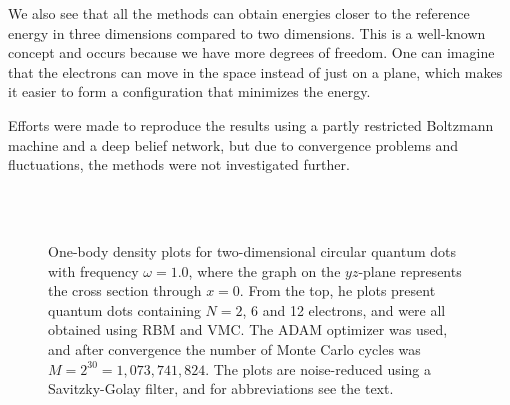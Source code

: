 We also see that all the methods can obtain energies closer to the reference energy in three dimensions compared to two dimensions. This is a well-known concept and occurs because we have more degrees of freedom. One can imagine that the electrons can move in the space instead of just on a plane, which makes it easier to form a configuration that minimizes the energy. 

Efforts were made to reproduce the results using a partly restricted Boltzmann machine and a deep belief network, but due to convergence problems and fluctuations, the methods were not investigated further. 

\begin{figure}
	\centering
	\captionsetup[subfigure]{labelformat=empty}
	\hspace{0.1cm}
	\hspace{-0.0cm}
	\\
	
	\hspace{0.05cm}
	\hspace{-0.0cm}
	\\
	
	\hspace{0.1cm}
	\hspace{-0.0cm}
	
	\caption{One-body density plots for two-dimensional circular quantum dots with frequency $\omega=1.0$, where the graph on the $yz$-plane represents the cross section through $x=0$. From the top, he plots present quantum dots containing $N=2$, 6 and 12 electrons, and were all obtained using RBM and VMC. The ADAM optimizer was used, and after convergence the number of Monte Carlo cycles was $M=2^{30}=1,073,741,824$. The plots are noise-reduced using a Savitzky-Golay filter, and for abbreviations see the text.}
	\label{fig:OB_interaction_1p0w1}
\end{figure}
